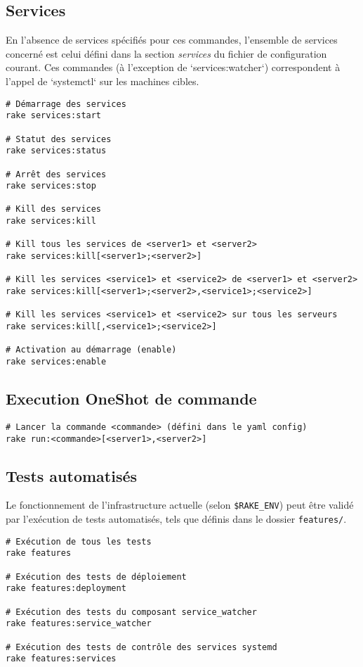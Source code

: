 \documentclass[a4paper,oneside,11pt]{article}
\begin{document}
\subsection{Services}

En l'absence de services spécifiés pour ces commandes, l'ensemble de services
concerné est celui défini dans la section \textit{services} du fichier de configuration
courant. Ces commandes (à l'exception de `services:watcher`) correspondent
à l'appel de `systemctl` sur les machines cibles.

\begin{verbatim}
# Démarrage des services
rake services:start

# Statut des services
rake services:status

# Arrêt des services
rake services:stop

# Kill des services
rake services:kill

# Kill tous les services de <server1> et <server2>
rake services:kill[<server1>;<server2>]

# Kill les services <service1> et <service2> de <server1> et <server2>
rake services:kill[<server1>;<server2>,<service1>;<service2>]

# Kill les services <service1> et <service2> sur tous les serveurs
rake services:kill[,<service1>;<service2>]

# Activation au démarrage (enable)
rake services:enable
\end{verbatim}

\subsection{Execution OneShot de commande}

\begin{verbatim}
# Lancer la commande <commande> (défini dans le yaml config)
rake run:<commande>[<server1>,<server2>]
\end{verbatim}


\subsection{Tests automatisés}

Le fonctionnement de l'infrastructure actuelle (selon \verb!$RAKE_ENV!) peut être
validé par l'exécution de tests automatisés, tels que définis dans le dossier
\verb!features/!.

\begin{verbatim}
# Exécution de tous les tests
rake features

# Exécution des tests de déploiement
rake features:deployment

# Exécution des tests du composant service_watcher
rake features:service_watcher

# Exécution des tests de contrôle des services systemd
rake features:services
\end{verbatim}
\end{document}
